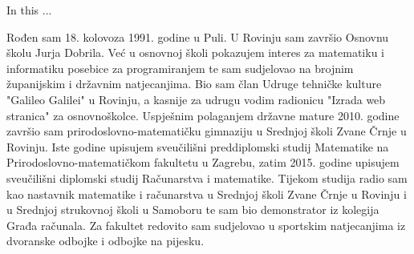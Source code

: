\documentclass[a4paper,oneside,12pt]{memoir} %
\begin{document}
\begin{summary}
In this ...
\end{summary}

\begin{cv}
Rođen sam 18. kolovoza 1991. godine u Puli. U Rovinju sam završio Osnovnu školu Jurja Dobrila. Već u osnovnoj školi pokazujem interes za matematiku i informatiku posebice za programiranjem te sam sudjelovao na brojnim županijskim i državnim natjecanjima. Bio sam član Udruge tehničke kulture "Galileo Galilei" u Rovinju, a kasnije za udrugu vodim radionicu "Izrada web stranica" za osnovnoškolce. Uspješnim polaganjem državne mature 2010. godine završio sam prirodoslovno-matematičku gimnaziju u Srednjoj školi Zvane Črnje u Rovinju. Iste godine upisujem sveučilišni preddiplomski studij Matematike na Prirodoslovno-matematičkom fakultetu u Zagrebu, zatim 2015. godine  upisujem sveučilišni diplomski studij Računarstva i matematike. Tijekom studija radio sam kao nastavnik matematike i računarstva u Srednjoj školi Zvane Črnje u Rovinju i u Srednjoj strukovnoj školi u Samoboru te sam bio demonstrator iz kolegija Građa računala. Za fakultet redovito sam sudjelovao u sportskim natjecanjima iz dvoranske odbojke i odbojke na pijesku. 
\end{cv}
\end{document}
